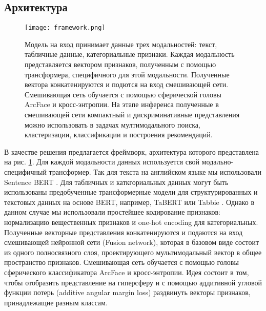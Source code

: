 \documentclass{article}
\begin{document}
\subsection{Архитектура}
\begin{figure}[H]
  \centering
  \texttt{[image: framework.png]}
  \caption{Модель на вход принимает данные трех модальностей: текст, табличные данные, категориальные признаки. Каждая модальность представляется вектором признаков, полученным с помощью трансформера, специфичного для этой модальности. Полученные вектора конкатенируются и подются на вход смешивающей сети. Смешивающая сеть обучается с помощью сферической головы ArcFace и кросс-энтропии. На этапе инференса полученные в смешивающей сети компактный и дискриминативные представления можно использовать в задачах мултимодального поиска, кластеризации, классификации и построения рекомендаций.}
  \label{fig:fig1}
\end{figure}
В качестве решения предлагается фреймворк, архитектура которого представлена на рис. \ref{fig:fig1}.
Для каждой модальности данных используется свой модально-специфичный трансформер. Так для текста на английском языке мы использовали Sentence BERT \cite{reimers-2019-sentence-bert}. Для табличных и каткгориальных данных могут быть использованы предобученные трансформерные модели для структурированных и текстовых данных на основе BERT, например, TaBERT \cite{yin2020tabert} или Tabbie \cite{iida2021tabbie}. Однако в данном случае мы использовали простейшее кодирование признаков: нормализацию вещественных признаков и one-hot encoding для категориальных. Полученные векторные представления конкатенируются и подаются на вход смешивающей нейронной сети (Fusion network), которая в базовом виде состоит из одного полносвязного слоя, проектирующего мультимодальный вектор в общее пространство признаков. Смешивающая сеть обучается с помощью головы сферического классификатора ArcFace \cite{deng2019arcface} и кросс-энтропии. Идея состоит в том, чтобы отобразить представление на гиперсферу и с помощью аддитивной угловой функции потерь (additive angular margin loss) раздвинуть векторы признаков, принадлежащие разным классам.
\end{document}
